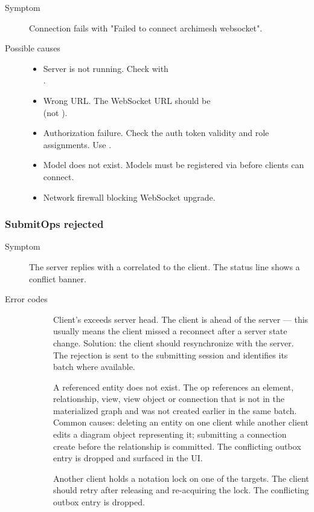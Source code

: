 \begin{description}
\item[Symptom] Connection fails with "Failed to connect archimesh websocket".
\item[Possible causes]
  \begin{itemize}
  \item Server is not running. Check with \\
    .
  \item Wrong URL. The WebSocket URL should be \\
     (not ).
  \item Authorization failure. Check the auth token validity and role
    assignments. Use .
  \item Model does not exist. Models must be registered via
     before clients can connect.
  \item Network firewall blocking WebSocket upgrade.
  \end{itemize}
\end{description}

\subsubsection{SubmitOps rejected}

\begin{description}
\item[Symptom] The server replies with a correlated  to the client.
  The status line shows a conflict banner.
\item[Error codes]
  \begin{description}
  \item[] Client's  exceeds
    server head. The client is ahead of the server --- this usually means
    the client missed a reconnect after a server state change. Solution: the
    client should resynchronize with the server. The rejection is sent to
    the submitting session and identifies its batch where available.
  \item[] A referenced entity does not exist.
    The op references an element, relationship, view, view object or
    connection that is not in the materialized graph and was not created
    earlier in the same batch. Common causes: deleting an entity on one
    client while another client edits a diagram object representing it;
    submitting a connection create before the relationship is committed.
    The conflicting outbox entry is dropped and surfaced in the UI.
  \item[] Another client holds a notation lock on
    one of the targets. The client should retry after releasing and
    re-acquiring the lock. The conflicting outbox entry is dropped.
  \end{description}
\end{description}

